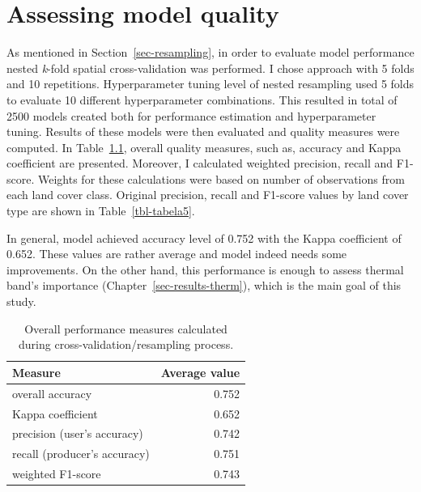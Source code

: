 \documentclass{amuthesis}
\begin{document}

\hypertarget{sec-results-eval}{%
\chapter{Assessing model quality}\label{sec-results-eval}}

As mentioned in Section~\ref{sec-resampling}, in order to evaluate model
performance nested \emph{k}-fold spatial cross-validation was performed.
I chose approach with 5 folds and 10 repetitions. Hyperparameter tuning
level of nested resampling used 5 folds to evaluate 10 different
hyperparameter combinations. This resulted in total of 2500 models
created both for performance estimation and hyperparameter tuning.
Results of these models were then evaluated and quality measures were
computed. In Table~\ref{tbl-tabela4}, overall quality measures, such as,
accuracy and Kappa coefficient are presented. Moreover, I calculated
weighted precision, recall and F1-score. Weights for these calculations
were based on number of observations from each land cover class.
Original precision, recall and F1-score values by land cover type are
shown in Table~\ref{tbl-tabela5}.

In general, model achieved accuracy level of 0.752 with the Kappa
coefficient of 0.652. These values are rather average and model indeed
needs some improvements. On the other hand, this performance is enough
to assess thermal band's importance (Chapter~\ref{sec-results-therm}),
which is the main goal of this study.

\hypertarget{tbl-tabela4}{}
\begin{table}
\caption{\label{tbl-tabela4}Overall performance measures calculated during
cross-validation/resampling process. }\tabularnewline

\centering
\begin{tabular}{|>{}l|>{}r|}
\toprule
\textbf{Measure} & \textbf{Average value}\\
\midrule
overall accuracy & 0.752\\
\hline
Kappa coefficient & 0.652\\
\hline
precision (user's accuracy) & 0.742\\
\hline
recall (producer's accuracy) & 0.751\\
\hline
weighted F1-score & 0.743\\
\bottomrule
\end{tabular}
\end{table}
\end{document}
